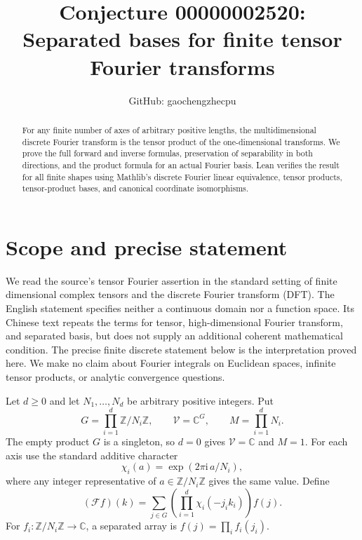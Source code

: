 \documentclass[11pt]{article}
\title{Conjecture 00000002520:\\Separated bases for finite tensor Fourier transforms}
\author{GitHub: gaochengzhecpu}
\date{}
\newcommand{\C}{\mathbb C}
\newcommand{\Z}{\mathbb Z}
\newcommand{\F}{\mathcal F}
\begin{document}
\maketitle

\begin{abstract}
For any finite number of axes of arbitrary positive lengths, the
multidimensional discrete Fourier transform is the tensor product of
the one-dimensional transforms. We prove the full forward and inverse
formulas, preservation of separability in both directions, and the
product formula for an actual Fourier basis. Lean verifies the result
for all finite shapes using Mathlib's discrete Fourier linear
equivalence, tensor products, tensor-product bases, and canonical
coordinate isomorphisms.
\end{abstract}

\section{Scope and precise statement}
We read the source's tensor Fourier assertion in the standard setting
of finite dimensional complex tensors and the discrete Fourier
transform (DFT). The English statement specifies neither a continuous
domain nor a function space. Its Chinese text repeats the terms for
tensor, high-dimensional Fourier transform, and separated basis, but
does not supply an additional coherent mathematical condition.
The precise finite discrete statement below is the interpretation proved
here. We make no claim about Fourier integrals on Euclidean spaces,
infinite tensor products, or analytic convergence questions.

Let $d\ge0$ and let $N_1,\ldots,N_d$ be arbitrary positive integers.
Put
\[
G=\prod_{i=1}^d\Z/N_i\Z,\qquad
\mathcal V=\C^G,\qquad M=\prod_{i=1}^dN_i.
\]
The empty product $G$ is a singleton, so $d=0$ gives $\mathcal V=\C$
and $M=1$. For each axis use the standard additive character
\[
\chi_i(a)=\exp(2\pi\mathrm i\,a/N_i),
\]
where any integer representative of $a\in\Z/N_i\Z$ gives the same
value. Define
\[
(\F f)(k)=\sum_{j\in G}\left(\prod_{i=1}^d\chi_i(-j_i k_i)\right)f(j).
\]
For $f_i:\Z/N_i\Z\to\C$, a separated array is
$f(j)=\prod_i f_i(j_i)$.
\end{document}
